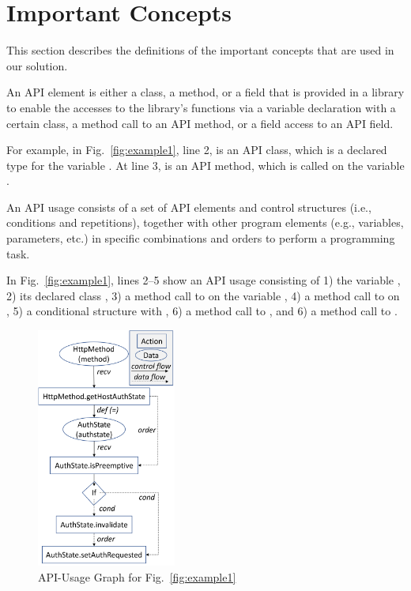 \section{Important Concepts}
\label{sec:concepts}

This section describes the definitions of the important concepts
that are used in our solution.



\begin{Definition}
An API element is either a class, a method, or a field that is
provided in a library to enable the accesses to the library's
functions via a variable declaration with a certain class, a method
call to an API method, or a field access to an API field.
\end{Definition}

For example, in Fig.~\ref{fig:example1}, line 2,  is
an API class, which is a declared type for the variable
. At line 3,  is an API
method, which is called on the variable .

\begin{Definition}
An API usage consists of a set of API elements and control structures
(i.e., conditions and repetitions), together with other program
elements (e.g., variables, parameters, etc.) in specific combinations
and orders to perform a programming task.
\end{Definition}

In Fig.~\ref{fig:example1}, lines 2--5 show an API usage consisting of
1) the variable , 2) its declared class
, 3) a method call to  on the
variable , 4) a method call to  on
, 5) a conditional structure with
, 6) a method call to , and 6) a method
call to .

\begin{figure}[t] %
	\centering
	\includegraphics[width=1.8in]{aug}
        \vspace{-3pt}
	\caption{API-Usage Graph for Fig.~\ref{fig:example1}}
	\label{fig:aug}
\end{figure}

